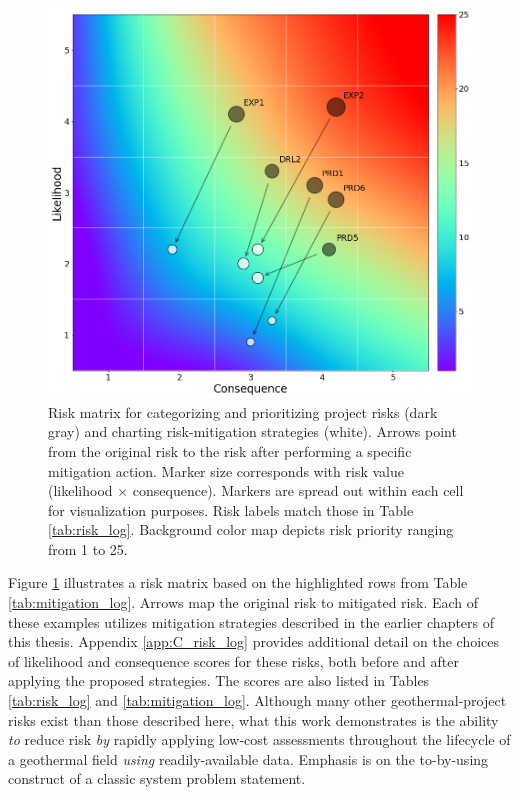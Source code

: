 \begin{figure}%
\centering
\includegraphics[width=\linewidth]{templates/images/Figure-Risk_Matrix.png}
\caption[Geothermal project risk matrix]{Risk matrix for categorizing and prioritizing project risks (dark gray) and charting risk-mitigation strategies (white). Arrows point from the original risk to the risk after performing a specific mitigation action. Marker size corresponds with risk value (likelihood $\times$ consequence). Markers are spread out within each cell for visualization purposes. Risk labels match those in Table \ref{tab:risk_log}. Background color map depicts risk priority ranging from 1 to 25.}
\label{fig:risk_matrix}
\end{figure}

Figure \ref{fig:risk_matrix} illustrates a risk matrix based on the highlighted rows from Table \ref{tab:mitigation_log}. Arrows map the original risk to mitigated risk. Each of these examples utilizes mitigation strategies described in the earlier chapters of this thesis. Appendix \ref{app:C_risk_log} provides additional detail on the choices of likelihood and consequence scores for these risks, both before and after applying the proposed strategies. The scores are also listed in Tables \ref{tab:risk_log} and \ref{tab:mitigation_log}. Although many other geothermal-project risks exist than those described here, what this work demonstrates is the ability \textit{to} reduce risk \textit{by} rapidly applying low-cost assessments throughout the lifecycle of a geothermal field \textit{using} readily-available data. Emphasis is on the to-by-using construct of a classic system problem statement.

